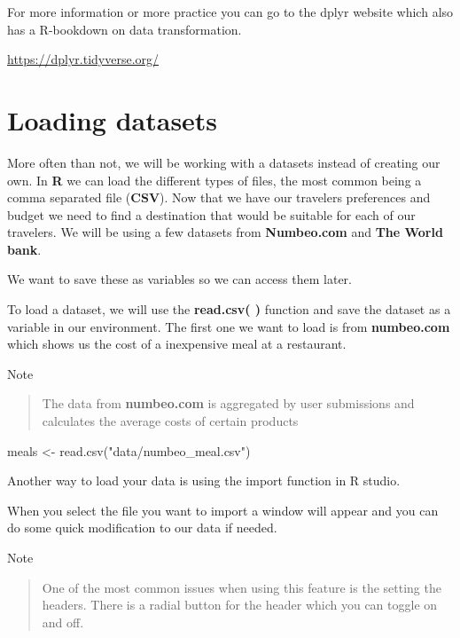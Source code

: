 \documentclass[
]{book}
\newenvironment{Shaded}{\begin{snugshade}}{\end{snugshade}}
\newcommand{\FunctionTok}[1]{\textcolor[rgb]{0.00,0.00,0.00}{#1}}
\newcommand{\NormalTok}[1]{#1}
\newcommand{\OtherTok}[1]{\textcolor[rgb]{0.56,0.35,0.01}{#1}}
\newcommand{\StringTok}[1]{\textcolor[rgb]{0.31,0.60,0.02}{#1}}
\begin{document}
For more information or more practice you can go to the dplyr website which also has a R-bookdown on data transformation.

\url{https://dplyr.tidyverse.org/}

\hypertarget{loading-datasets}{%
\section{Loading datasets}\label{loading-datasets}}

More often than not, we will be working with a datasets instead of creating our own. In \textbf{R} we can load the different types of files, the most common being a comma separated file (\textbf{CSV}). Now that we have our travelers preferences and budget we need to find a destination that would be suitable for each of our travelers. We will be using a few datasets from \textbf{Numbeo.com} and \textbf{The World bank}.

We want to save these as variables so we can access them later.

To load a dataset, we will use the \textbf{read.csv( )} function and save the dataset as a variable in our environment. The first one we want to load is from \textbf{numbeo.com} which shows us the cost of a inexpensive meal at a restaurant.

Note

\begin{quote}
The data from \textbf{numbeo.com} is aggregated by user submissions and calculates the average costs of certain products
\end{quote}

\begin{Shaded}
\begin{Highlighting}[]
\NormalTok{meals }\OtherTok{\textless{}{-}} \FunctionTok{read.csv}\NormalTok{(}\StringTok{"data/numbeo\_meal.csv"}\NormalTok{)}
\end{Highlighting}
\end{Shaded}

Another way to load your data is using the import function in R studio.

When you select the file you want to import a window will appear and you can do some quick modification to our data if needed.

Note

\begin{quote}
One of the most common issues when using this feature is the setting the headers. There is a radial button for the header which you can toggle on and off.
\end{quote}
\end{document}
